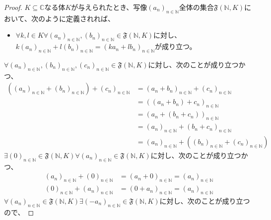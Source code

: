 \documentclass[dvipdfmx]{jsarticle}
\begin{document}
\begin{proof}
$K \subseteq \mathbb{C}$なる体$K$が与えられたとき、写像$\left( a_{n} \right)_{n \in \mathbb{N}}$全体の集合$\mathfrak{F}\left( \mathbb{N},K \right)$において、次のように定義されれば、
\begin{itemize}
\item
  $\forall k,l \in K\forall\left( a_{n} \right)_{n \in \mathbb{N}},\left( b_{n} \right)_{n \in \mathbb{N}}\in \mathfrak{F}\left( \mathbb{N},K \right)$に対し、$k\left( a_{n} \right)_{n \in \mathbb{N}} + l\left( b_{n} \right)_{n \in \mathbb{N}} = \left( ka_{n} + lb_{n} \right)_{n \in \mathbb{N}}$が成り立つ。
\end{itemize}
$\forall\left( a_{n} \right)_{n \in \mathbb{N}},\left( b_{n} \right)_{n \in \mathbb{N}},\left( c_{n} \right)_{n \in \mathbb{N}}\in \mathfrak{F}\left( \mathbb{N},K \right)$に対し、次のことが成り立つかつ、
\begin{align*}
\left( \left( a_{n} \right)_{n \in \mathbb{N}} + \left( b_{n} \right)_{n \in \mathbb{N}} \right) + \left( c_{n} \right)_{n \in \mathbb{N}} &= \left( a_{n} + b_{n} \right)_{n \in \mathbb{N}} + \left( c_{n} \right)_{n \in \mathbb{N}} \\
&= \left( \left( a_{n} + b_{n} \right) + c_{n} \right)_{n \in \mathbb{N}}\\
&= \left( a_{n} + \left( b_{n} + c_{n} \right) \right)_{n \in \mathbb{N}} \\
&= \left( a_{n} \right)_{n \in \mathbb{N}} + \left( b_{n} + c_{n} \right)_{n \in \mathbb{N}}\\
&= \left( a_{n} \right)_{n \in \mathbb{N}} + \left( \left( b_{n} \right)_{n \in \mathbb{N}} + \left( c_{n} \right)_{n \in \mathbb{N}} \right)
\end{align*}
$\exists(0)_{n \in \mathbb{N}}\in \mathfrak{F}\left( \mathbb{N},K \right)\forall\left( a_{n} \right)_{n \in \mathbb{N}}\in \mathfrak{F}\left( \mathbb{N},K \right)$に対し、次のことが成り立つかつ、
\begin{align*}
\left( a_{n} \right)_{n \in \mathbb{N}} + (0)_{n \in \mathbb{N}} &= \left( a_{n} + 0 \right)_{n \in \mathbb{N}} = \left( a_{n} \right)_{n \in \mathbb{N}}\\
(0)_{n \in \mathbb{N}} + \left( a_{n} \right)_{n \in \mathbb{N}} &= \left( 0 + a_{n} \right)_{n \in \mathbb{N}} = \left( a_{n} \right)_{n \in \mathbb{N}}
\end{align*}
$\forall\left( a_{n} \right)_{n \in \mathbb{N}}\in \mathfrak{F}\left( \mathbb{N},K \right)\exists\left( - a_{n} \right)_{n \in \mathbb{N}}\in \mathfrak{F}\left( \mathbb{N},K \right)$に対し、次のことが成り立つので、

\end{proof}
\end{document}
